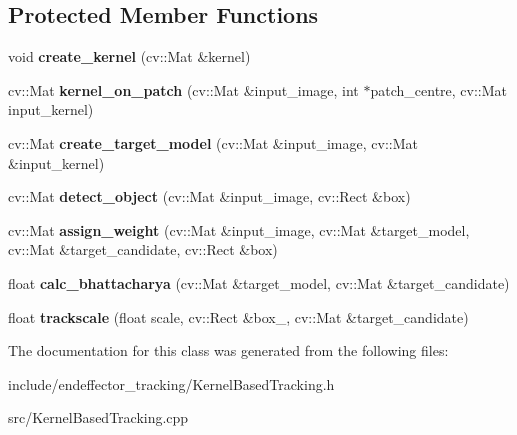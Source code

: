 \subsection*{\-Protected \-Member \-Functions}
\begin{DoxyCompactItemize}
\item 
\hypertarget{classKernelBasedTracking_a4b52e3e90d2efd06f08d2c71766b7c4e}{void {\bfseries create\-\_\-kernel} (cv\-::\-Mat \&kernel)}\label{classKernelBasedTracking_a4b52e3e90d2efd06f08d2c71766b7c4e}

\item 
\hypertarget{classKernelBasedTracking_a6d9afda53d7fedce891349c0013ab7b4}{cv\-::\-Mat {\bfseries kernel\-\_\-on\-\_\-patch} (cv\-::\-Mat \&input\-\_\-image, int $\ast$patch\-\_\-centre, cv\-::\-Mat input\-\_\-kernel)}\label{classKernelBasedTracking_a6d9afda53d7fedce891349c0013ab7b4}

\item 
\hypertarget{classKernelBasedTracking_a63af23050ebf423d1fa48817bc0b6b1a}{cv\-::\-Mat {\bfseries create\-\_\-target\-\_\-model} (cv\-::\-Mat \&input\-\_\-image, cv\-::\-Mat \&input\-\_\-kernel)}\label{classKernelBasedTracking_a63af23050ebf423d1fa48817bc0b6b1a}

\item 
\hypertarget{classKernelBasedTracking_a069228aa013950c25404d1c851c0d088}{cv\-::\-Mat {\bfseries detect\-\_\-object} (cv\-::\-Mat \&input\-\_\-image, cv\-::\-Rect \&box)}\label{classKernelBasedTracking_a069228aa013950c25404d1c851c0d088}

\item 
\hypertarget{classKernelBasedTracking_acd9923313aab07869c79785f8a5650be}{cv\-::\-Mat {\bfseries assign\-\_\-weight} (cv\-::\-Mat \&input\-\_\-image, cv\-::\-Mat \&target\-\_\-model, cv\-::\-Mat \&target\-\_\-candidate, cv\-::\-Rect \&box)}\label{classKernelBasedTracking_acd9923313aab07869c79785f8a5650be}

\item 
\hypertarget{classKernelBasedTracking_a49504e1e62b376cc0a46d45254ffcd25}{float {\bfseries calc\-\_\-bhattacharya} (cv\-::\-Mat \&target\-\_\-model, cv\-::\-Mat \&target\-\_\-candidate)}\label{classKernelBasedTracking_a49504e1e62b376cc0a46d45254ffcd25}

\item 
\hypertarget{classKernelBasedTracking_a7b29cd489be190ab4de25006cf1d60d7}{float {\bfseries trackscale} (float scale, cv\-::\-Rect \&box\-\_\-, cv\-::\-Mat \&target\-\_\-candidate)}\label{classKernelBasedTracking_a7b29cd489be190ab4de25006cf1d60d7}

\end{DoxyCompactItemize}


\-The documentation for this class was generated from the following files\-:\begin{DoxyCompactItemize}
\item 
include/endeffector\-\_\-tracking/\-Kernel\-Based\-Tracking.\-h\item 
src/\-Kernel\-Based\-Tracking.\-cpp\end{DoxyCompactItemize}
